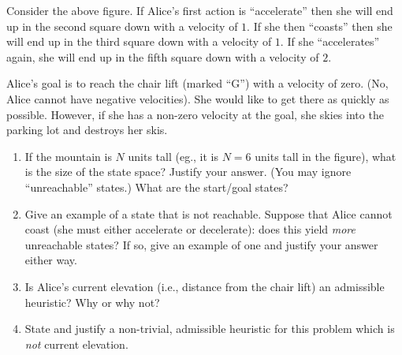 Consider the above figure.  If Alice's first action is ``accelerate''
then she will end up in the second square down with a velocity of
$1$.  If she then ``coasts'' then she will end up in the third square
down with a velocity of $1$.  If she ``accelerates'' again, she will
end up in the fifth square down with a velocity of $2$.

Alice's goal is to reach the chair lift (marked ``G'') with a velocity
of zero.  (No, Alice cannot have negative velocities).  She would like
to get there as quickly as possible.  However, if she has a non-zero
velocity at the goal, she skies into the parking lot and destroys her
skis.


\begin{enumerate}
\item If the mountain is $N$ units tall (eg., it is $N=6$ units tall in
the figure), what is the size of the state space?  Justify your
answer.  (You may ignore ``unreachable'' states.)  What are the
start/goal states?

\item Give an example of a state that is not reachable.  Suppose that
Alice cannot coast (she must either accelerate or decelerate): does this
yield \emph{more} unreachable states? If so, give an example of one and
justify your answer either way.

\item Is Alice's current elevation (i.e., distance from the chair lift)
an admissible heuristic?  Why or why not?

\item State and justify a non-trivial, admissible heuristic for this
problem which is \emph{not} current elevation.
\end{enumerate}



